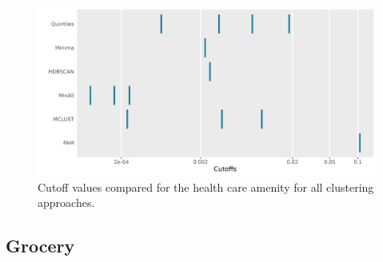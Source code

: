 \documentclass[11pt, a4paper]{article}
\begin{document}
\begin{figure}[H]
\centering
\includegraphics[width=\textwidth]{./cutoff_ticks/Health care_ticks.png}
\caption[Health care cutoff comparison]{Cutoff values compared for the health care amenity for all clustering approaches.}\label{healthcareticks}
\end{figure}









\justifying
\subsection{Grocery}
\end{document}
